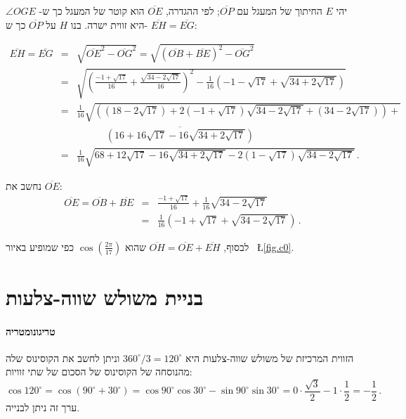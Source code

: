 \documentclass[11pt,a4paper]{article}
\newenvironment{form}[1]{%
\begin{displaymath}%
\renewcommand{\arraystretch}{#1}%
\begin{array}{lcl}}%
{\end{array}%
\end{displaymath}%
}
\newcommand*{\disfrac}[2]{\displaystyle\frac{#1}{#2}}
\begin{document}
יהי
$E$
החיתוך של המעגל עם
$\overline{OP}$;
לפי ההגדרה,
$\overline{OE}$
הוא קוטר של המעגל כך ש-%
$\angle OGE$
היא זווית ישרה.
בנו
$H$
על
$\overline{OP}$
כך ש-%
$\overline{EH}=\overline{EG}$:

\begin{form}{2}
\overline{EH}=\overline{EG}&=&\sqrt{\overline{OE}^2-\overline{OG}^2}=\sqrt{(\overline{OB}+\overline{BE})^2-\overline{OG}^2}\\
&=&\sqrt{\left(\disfrac{-1+\sqrt{17}}{16}+\disfrac{\sqrt{34-2\sqrt{17}}}{16}\right)^2-
\disfrac{1}{16}\left(-1-\sqrt{17}+\sqrt{34+2\sqrt{17}}\right)}
\\
&=&\disfrac{1}{16}\sqrt{\left(
(18-2\sqrt{17})+ 2(-1+\sqrt{17})\sqrt{34-2\sqrt{17}}+
(34-2\sqrt{17})\right)+}\\
&&\quad\quad\quad\overline{
\left(16+16\sqrt{17}-16\sqrt{34+2\sqrt{17}}\right)}\\
&=&\disfrac{1}{16}\sqrt{
68+12\sqrt{17}-16\sqrt{34+2\sqrt{17}}-2(1-\sqrt{17})\sqrt{34-2\sqrt{17}}
}\,.
\end{form}

נחשב את
$\overline{OE}$:
\begin{form}{2}
\overline{OE}=\overline{OB}+\overline{BE}&=&\disfrac{-1+\sqrt{17}}{16}+\disfrac{1}{16}\sqrt{34-2\sqrt{17}}\\
&=&\disfrac{1}{16}\left(-1+\sqrt{17}+\sqrt{34-2\sqrt{17}}\right)\,.
\end{form}

לבסוף,
$\overline{OH}=\overline{OE}+\overline{EH}$
שהוא
$\cos \left(\disfrac{2\pi}{17}\right)$
כפי שמופיע באיור~%
\L{\ref{fig.c0}}.

\newpage

\appendix
\section{בניית משולש שווה-צלעות}\label{a.triangle}


\paragraph{טריגונומטריה}
הזווית המרכיזת של משולש שווה-צלעות היא
$360^\circ/3=120^\circ$ 
וניתן לחשב את הקוסינוס שלה מהנוסחה של הקוסינוס של הסכום של שתי זוויות:
\[
\cos 120^\circ = \cos(90^\circ+30^\circ)=\cos 90^\circ \cos 30^\circ  -\sin 90^\circ \sin 30^\circ = 0\cdot \frac{\sqrt{3}}{2} - 1\cdot \frac{1}{2}=-\disfrac{1}{2}\,.
\]
ערך זה ניתן לבנייה.
\end{document}

